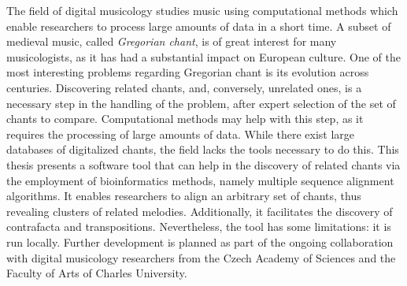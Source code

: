 \documentclass[12pt]{report}
\begin{document}

The field of digital musicology studies music using computational methods which enable researchers to process large amounts of data in a short time.
A subset of medieval music, called \emph{Gregorian chant}, is of great interest for many musicologists, as it has had a substantial impact on European culture.
One of the most interesting problems regarding Gregorian chant is its evolution across centuries.
Discovering related chants, and, conversely, unrelated ones, is a necessary step in the handling of the problem, after expert selection of the set of chants to compare.
Computational methods may help with this step, as it requires the processing of large amounts of data.
While there exist large databases of digitalized chants, the field lacks the tools necessary to do this.
This thesis presents a software tool that can help in the discovery of related chants via the employment of bioinformatics methods, namely multiple sequence alignment algorithms.
It enables researchers to align an arbitrary set of chants, thus revealing clusters of related melodies.
Additionally, it facilitates the discovery of contrafacta and transpositions. 
Nevertheless, the tool has some limitations: it is run locally.
Further development is planned as part of the ongoing collaboration with digital musicology researchers from the Czech Academy of Sciences and the Faculty of Arts of Charles University.
\end{document}
